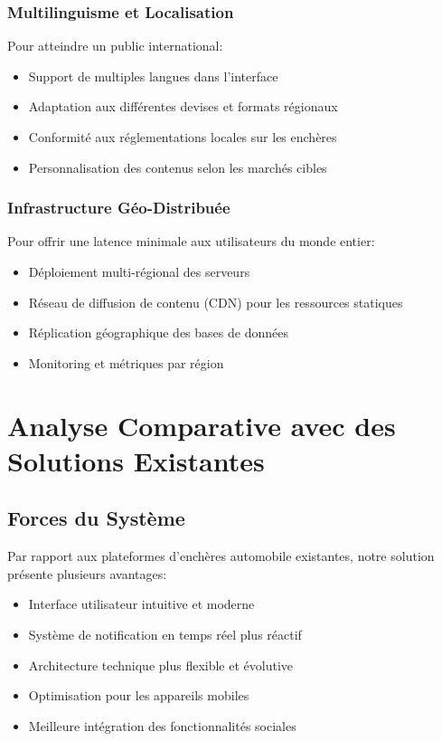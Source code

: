 \subsubsection{Multilinguisme et Localisation}
Pour atteindre un public international:
\begin{itemize}
    \item Support de multiples langues dans l'interface
    \item Adaptation aux différentes devises et formats régionaux
    \item Conformité aux réglementations locales sur les enchères
    \item Personnalisation des contenus selon les marchés cibles
\end{itemize}

\subsubsection{Infrastructure Géo-Distribuée}
Pour offrir une latence minimale aux utilisateurs du monde entier:
\begin{itemize}
    \item Déploiement multi-régional des serveurs
    \item Réseau de diffusion de contenu (CDN) pour les ressources statiques
    \item Réplication géographique des bases de données
    \item Monitoring et métriques par région
\end{itemize}

\section{Analyse Comparative avec des Solutions Existantes}

\subsection{Forces du Système}
Par rapport aux plateformes d'enchères automobile existantes, notre solution présente plusieurs avantages:
\begin{itemize}
    \item Interface utilisateur intuitive et moderne
    \item Système de notification en temps réel plus réactif
    \item Architecture technique plus flexible et évolutive
    \item Optimisation pour les appareils mobiles
    \item Meilleure intégration des fonctionnalités sociales
\end{itemize}

